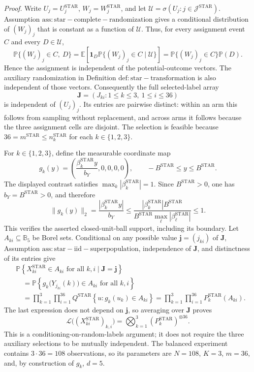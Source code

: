 \emph{Proof.}
Write \(U_j=U_j^{\mathrm{STAR}}\), \(W_j=W_j^{\mathrm{STAR}}\), and let
\(\mathcal U=\sigma(U_j:j\in\mathcal J^{\mathrm{STAR}})\).  Assumption
\(\mathrm{ass:star-complete-randomization}\) gives a conditional distribution of
\((W_j)_j\) that is constant as a function of \(\mathcal U\).  Thus, for every
assignment event \(C\) and every \(D\in\mathcal U\),
\[
 \mathbb P\{(W_j)_j\in C,\ D\}
 =\mathbb E\!\left[\mathbf 1_D
   \mathbb P\{(W_j)_j\in C\mid\mathcal U\}\right]
 =\mathbb P\{(W_j)_j\in C\}\mathbb P(D).
\]
Hence the assignment is independent of the potential-outcome vectors.  The
auxiliary randomization in Definition \(\mathrm{def:star-transformation}\) is
also independent of those vectors.  Consequently the full selected-label
array
\[
 \mathbf J=(J_{ki}:1\leq k\leq3,\ 1\leq i\leq36)
\]
is independent of \((U_j)_j\).  Its entries are pairwise distinct: within an
arm this follows from sampling without replacement, and across arms it follows
because the three assignment cells are disjoint.  The selection is feasible
because \(36=m^{\mathrm{STAR}}\leq n_k^{\mathrm{STAR}}\) for each
\(k\in\{1,2,3\}\).

For \(k\in\{1,2,3\}\), define the measurable coordinate map
\[
 g_k(y)=\left(\frac{\beta_k^{\mathrm{STAR}}y}{b_Y},0,0,0,0\right),
 \qquad -B^{\mathrm{STAR}}\leq y\leq B^{\mathrm{STAR}}.
\]
The displayed contrast satisfies
\(\max_k|\beta_k^{\mathrm{STAR}}|=1\).  Since
\(B^{\mathrm{STAR}}>0\), one has \(b_Y=B^{\mathrm{STAR}}>0\), and therefore
\[
 \|g_k(y)\|_2
 =\frac{|\beta_k^{\mathrm{STAR}}y|}{b_Y}
 \leq\frac{|\beta_k^{\mathrm{STAR}}|B^{\mathrm{STAR}}}
 {B^{\mathrm{STAR}}\max_\ell|\beta_\ell^{\mathrm{STAR}}|}
 \leq1.
\]
This verifies the asserted closed-unit-ball support, including its boundary.
Let \(A_{ki}\subseteq\mathbb B_5\) be Borel sets.  Conditional on any possible
value \(\mathbf j=(j_{ki})\) of \(\mathbf J\), Assumption
\(\mathrm{ass:star-iid-superpopulation}\), independence of \(\mathbf J\), and
distinctness of its entries give
\[
\begin{aligned}
 &\mathbb P\!\left\{X_{ki}^{\mathrm{STAR}}\in A_{ki}
       \text{ for all }k,i\mid\mathbf J=\mathbf j\right\} \\
 &\quad=
 \mathbb P\!\left\{g_k\bigl(Y_{j_{ki}}(k)\bigr)\in A_{ki}
       \text{ for all }k,i\right\} \\
 &\quad=\prod_{k=1}^3\prod_{i=1}^{36}
 Q^{\mathrm{STAR}}\!\left\{u:g_k(u_k)\in A_{ki}\right\}
 =\prod_{k=1}^3\prod_{i=1}^{36}P_k^{\mathrm{STAR}}(A_{ki}).
\end{aligned}
\]
The last expression does not depend on \(\mathbf j\), so averaging over
\(\mathbf J\) proves
\[
 \mathcal L\bigl((X_{ki}^{\mathrm{STAR}})_{k,i}\bigr)
 =\bigotimes_{k=1}^3(P_k^{\mathrm{STAR}})^{\otimes36}.
\]
This is a conditioning-on-random-labels argument; it does not require the
three auxiliary selections to be mutually independent.  The balanced
experiment contains \(3\cdot36=108\) observations, so its parameters are
\(N=108\), \(K=3\), \(m=36\), and, by construction of \(g_k\), \(d=5\).

